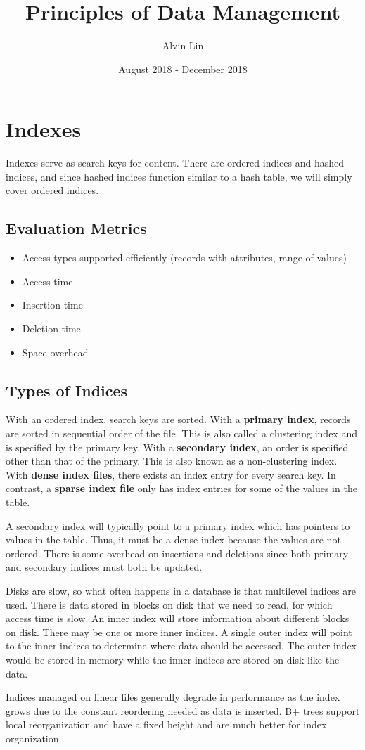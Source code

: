 \documentclass{math}
\title{Principles of Data Management}
\author{Alvin Lin}
\date{August 2018 - December 2018}
\begin{document}
\lstset{basicstyle=\ttfamily\footnotesize,breaklines=true}
\maketitle

\section*{Indexes}
Indexes serve as search keys for content. There are ordered indices and hashed
indices, and since hashed indices function similar to a hash table, we will
simply cover ordered indices.

\subsection*{Evaluation Metrics}
\begin{itemize}
  \item Access types supported efficiently (records with attributes, range of
    values)
  \item Access time
  \item Insertion time
  \item Deletion time
  \item Space overhead
\end{itemize}

\subsection*{Types of Indices}
With an ordered index, search keys are sorted. With a \textbf{primary index},
records are sorted in sequential order of the file. This is also called a
clustering index and is specified by the primary key. With a \textbf{secondary
index}, an order is specified other than that of the primary. This is also
known as a non-clustering index. With \textbf{dense index files}, there exists
an index entry for every search key. In contrast, a \textbf{sparse index file}
only has index entries for some of the values in the table. \par
A secondary index will typically point to a primary index which has pointers to
values in the table. Thus, it must be a dense index because the values are not
ordered. There is some overhead on insertions and deletions since both primary
and secondary indices must both be updated. \par
Disks are slow, so what often happens in a database is that multilevel indices
are used. There is data stored in blocks on disk that we need to read, for
which access time is slow. An inner index will store information about different
blocks on disk. There may be one or more inner indices. A single outer index
will point to the inner indices to determine where data should be accessed.
The outer index would be stored in memory while the inner indices are stored
on disk like the data. \par
Indices managed on linear files generally degrade in performance as the index
grows due to the constant reordering needed as data is inserted. B+ trees
support local reorganization and have a fixed height and are much better for
index organization.
\end{document}
